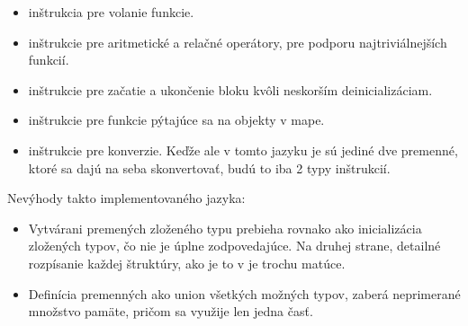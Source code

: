 \begin{itemize}
\item inštrukcia pre volanie funkcie.
\item inštrukcie pre aritmetické a relačné operátory, pre podporu najtriviálnejších funkcií.
\item inštrukcie pre začatie a ukončenie bloku kvôli neskorším deinicializáciam.
\item inštrukcie pre funkcie pýtajúce sa na objekty v mape.
\item inštrukcie pre konverzie. Keďže ale v tomto jazyku je sú jediné dve premenné, ktoré sa dajú na seba skonvertovať, budú to iba 2 typy inštrukcií.
\end{itemize}
Nevýhody takto implementovaného jazyka:
\begin{itemize}
\item Vytvárani premených zloženého typu prebieha rovnako ako inicializácia zložených typov, čo nie je úplne zodpovedajúce. Na druhej strane, detailné rozpísanie každej štruktúry, ako je to v je trochu matúce.\\
\item Definícia premenných ako union všetkých možných typov, zaberá neprimerané množstvo pamäte, pričom sa využije len jedna časť.
\end{itemize}
